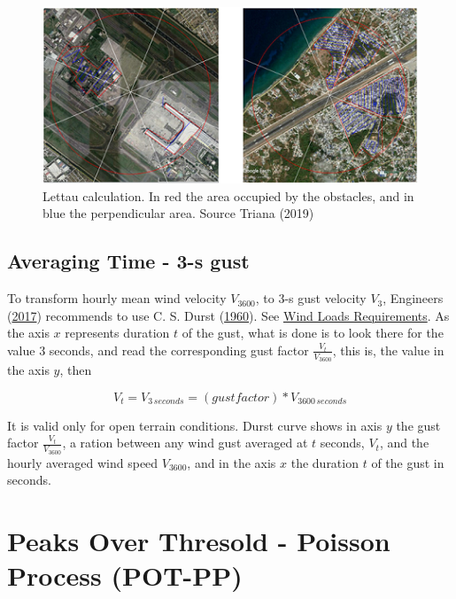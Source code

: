 \documentclass[12pt,oneside]{reedthesis}
\begin{document}
\footnotesize
\begin{figure}

{\centering \includegraphics[width=6.18in]{figure/lettauvalues} 

}

\caption{Lettau calculation. In red the area occupied by the obstacles, and in blue the perpendicular area. Source Triana (2019)}\label{fig:lettauvalues}
\end{figure}
\normalsize

\hypertarget{averaging-time---3-s-gust}{%
\subsection{Averaging Time - 3-s gust}\label{averaging-time---3-s-gust}}

To transform hourly mean wind velocity \(V_{3600}\), to 3-s gust velocity \(V_3\), Engineers (\protect\hyperlink{ref-Asce2017}{2017}) recommends to use C. S. Durst (\protect\hyperlink{ref-Durst1960}{1960}). See \protect\hyperlink{windloadsrequirements}{Wind Loads Requirements}. As the axis \(x\) represents duration \(t\) of the gust, what is done is to look there for the value 3 seconds, and read the corresponding gust factor \(\frac{V_t}{V_{3600}}\), this is, the value in the axis \(y\), then

\[
V_t = V_{3\,seconds} = (gust factor) * V_{3600\,seconds}
\]

It is valid only for open terrain conditions. Durst curve shows in axis \(y\) the gust factor \(\frac{V_t}{V_{3600}}\), a ration between any wind gust averaged at \(t\) seconds, \(V_t\), and the hourly averaged wind speed \(V_{3600}\), and in the axis \(x\) the duration \(t\) of the gust in seconds.

\hypertarget{peaks-over-thresold---poisson-process-pot-pp}{%
\section{Peaks Over Thresold - Poisson Process (POT-PP)}\label{peaks-over-thresold---poisson-process-pot-pp}}
\end{document}
